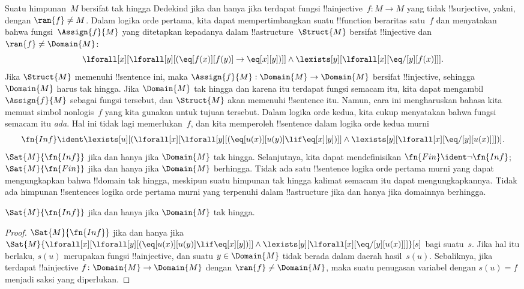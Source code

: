 \documentclass[../../../include/open-logic-section]{subfiles}
\begin{document}


Suatu himpunan~$M$ bersifat tak hingga Dedekind jika dan hanya jika
terdapat fungsi !!a{injective}~$f\colon M \to M$ yang tidak
!!{surjective}, yakni, dengan $\ran{f} \neq M$. Dalam logika orde pertama,
kita dapat mempertimbangkan suatu !!{function} beraritas satu~$f$ dan
menyatakan bahwa fungsi~$\Assign{f}{M}$ yang ditetapkan kepadanya dalam
!!a{structure}~$\Struct{M}$ bersifat !!{injective} dan
$\ran{f} \neq \Domain{M}$:
\[
\lforall[x][\lforall[y][(\eq[f(x)][f(y)] \to \eq[x][y])]] \land
\lexists[y][\lforall[x][\eq/[y][f(x)]]].
\]
Jika $\Struct{M}$ memenuhi !!{sentence} ini, maka
$\Assign{f}{M}: \Domain{M} \to \Domain{M}$ bersifat !!{injective},
sehingga $\Domain{M}$ harus tak hingga. Jika $\Domain{M}$ tak hingga dan
karena itu terdapat fungsi semacam itu, kita dapat mengambil
$\Assign{f}{M}$ sebagai fungsi tersebut, dan $\Struct{M}$ akan memenuhi
!!{sentence} itu. Namun, cara ini mengharuskan bahasa kita memuat simbol
nonlogis~$f$ yang kita gunakan untuk tujuan tersebut. Dalam logika orde kedua,
kita cukup menyatakan bahwa fungsi semacam itu \emph{ada}. Hal ini tidak lagi
memerlukan~$f$, dan kita memperoleh !!{sentence} dalam logika orde kedua murni
\[
\fn{Inf} \ident \lexists[u][(\lforall[x][\lforall[y][(\eq[u(x)][u(y)]
      \lif \eq[x][y])]] \land \lexists[y][\lforall[x][\eq/[y][u(x)]]])].
\]
$\Sat{M}{\fn{Inf}}$ jika dan hanya jika $\Domain{M}$ tak hingga. Selanjutnya,
kita dapat mendefinisikan $\fn{Fin} \ident \lnot \fn{Inf}$;
$\Sat{M}{\fn{Fin}}$ jika dan hanya jika $\Domain{M}$ berhingga. Tidak ada satu
!!{sentence} logika orde pertama murni yang dapat mengungkapkan bahwa
!!{domain} tak hingga, meskipun suatu himpunan tak hingga kalimat semacam itu
dapat mengungkapkannya. Tidak ada himpunan !!{sentence}s logika orde pertama murni
yang terpenuhi dalam !!a{structure} jika dan hanya jika domainnya berhingga.

\begin{prop}
$\Sat{M}{\fn{Inf}}$ jika dan hanya jika $\Domain{M}$ tak hingga.
\end{prop}

\begin{proof}
$\Sat{M}{\fn{Inf}}$ jika dan hanya jika
  $\Sat{M}{\lforall[x][\lforall[y][(\eq[u(x)][u(y)] \lif \eq[x][y])]]
    \land \lexists[y][\lforall[x][\eq/[y][u(x)]]]}[s]$ bagi suatu~$s$.
Jika hal itu berlaku, $s(u)$ merupakan fungsi !!a{injective}, dan suatu
$y \in \Domain{M}$ tidak berada dalam daerah hasil~$s(u)$. Sebaliknya, jika
terdapat !!a{injective} $f\colon \Domain{M} \to \Domain{M}$ dengan
$\ran{f} \neq \Domain{M}$, maka suatu penugasan variabel dengan
$s(u) = f$ menjadi saksi yang diperlukan.
\end{proof}
\end{document}
